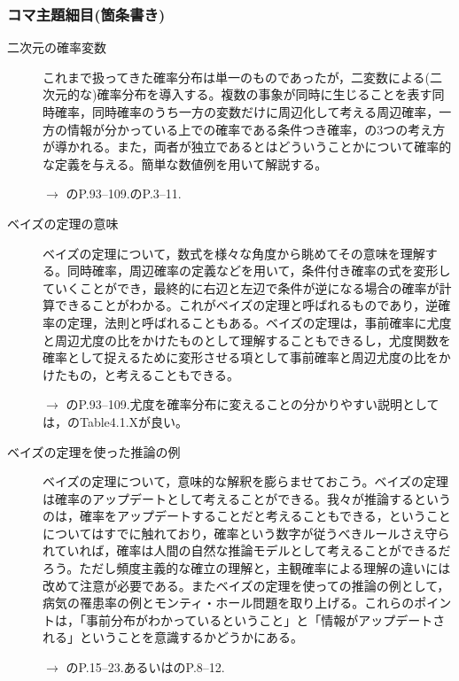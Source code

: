 \subsubsection{コマ主題細目(箇条書き)}
\begin{description}
\item[二次元の確率変数]これまで扱ってきた確率分布は単一のものであったが，二変数による(二次元的な)確率分布を導入する。複数の事象が同時に生じることを表す同時確率，同時確率のうち一方の変数だけに周辺化して考える周辺確率，一方の情報が分かっている上での確率である条件つき確率，の3つの考え方が導かれる。また，両者が独立であるとはどういうことかについて確率的な定義を与える。簡単な数値例を用いて解説する。
\begin{flushright}
    $\to$ \citet{Maeda2017}のP.93--109.\citet{豊田201506}のP.3--11.
\end{flushright}

\item[ベイズの定理の意味] ベイズの定理について，数式を様々な角度から眺めてその意味を理解する。同時確率，周辺確率の定義などを用いて，条件付き確率の式を変形していくことができ，最終的に右辺と左辺で条件が逆になる場合の確率が計算できることがわかる。これがベイズの定理と呼ばれるものであり，逆確率の定理，法則と呼ばれることもある。ベイズの定理は，事前確率に尤度と周辺尤度の比をかけたものとして理解することもできるし，尤度関数を確率として捉えるために変形させる項として事前確率と周辺尤度の比をかけたもの，と考えることもできる。
\begin{flushright}
    $\to$ \citet{Maeda2017}のP.93--109.尤度を確率分布に変えることの分かりやすい説明としては，\citet{Lambert201805}のTable4.1.Xが良い。
\end{flushright}

\item[ベイズの定理を使った推論の例]ベイズの定理について，意味的な解釈を膨らませておこう。ベイズの定理は確率のアップデートとして考えることができる。我々が推論するというのは，確率をアップデートすることだと考えることもできる，ということについてはすでに触れており，確率という数字が従うべきルールさえ守られていれば，確率は人間の自然な推論モデルとして考えることができるだろう。ただし頻度主義的な確立の理解と，主観確率による理解の違いには改めて注意が必要である。またベイズの定理を使っての推論の例として，病気の罹患率の例とモンティ・ホール問題を取り上げる。これらのポイントは，「事前分布がわかっているということ」と「情報がアップデートされる」ということを意識するかどうかにある。
\begin{flushright}
    $\to$ \citet{Maeda2017}のP.15--23.あるいは\citet{豊田201506}のP.8--12.
\end{flushright}

\end{description}
